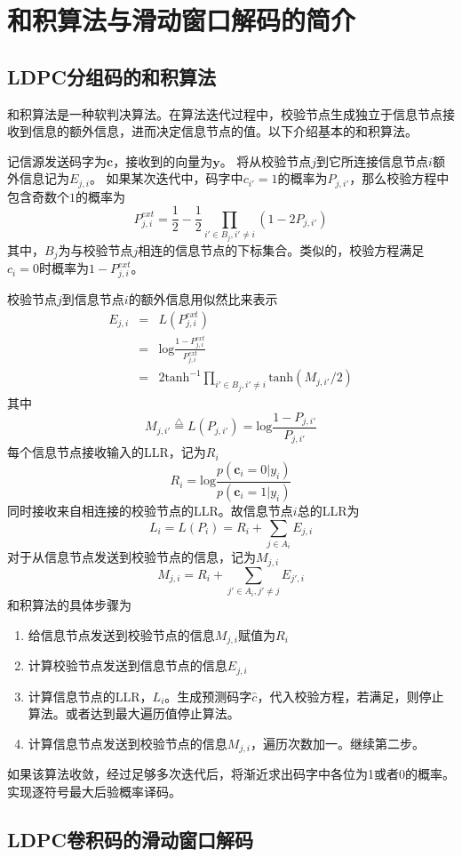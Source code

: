 \chapter{和积算法与滑动窗口解码的简介}
\section{LDPC分组码的和积算法}
和积算法是一种软判决算法。在算法迭代过程中，校验节点生成独立于信息节点接收到信息的额外信息，进而决定信息节点的值。以下介绍基本的和积算法。

记信源发送码字为$\mathbf{c}$，接收到的向量为$\mathbf{y}$。
将从校验节点$j$到它所连接信息节点$i$额外信息记为$E_{j,i}$。
如果某次迭代中，码字中$c_{i'}=1$的概率为$P_{j,i'}$，那么校验方程中包含奇数个$1$的概率为
\[
P_{j,i}^{ext} = \frac{1}{2} - \frac{1}{2} \prod_{i' \in B_j, i' \neq i} (1-2P_{j,i'})
\]
其中，$B_j$为与校验节点$j$相连的信息节点的下标集合。类似的，校验方程满足$c_{i}=0$时概率为$1-P_{j,i}^{ext}$。

校验节点$j$到信息节点$i$的额外信息用似然比来表示
\begin{eqnarray}
E_{j,i} & = & L(P_{j,i}^{ext})\\
& = & \text{log} \frac{1-P_{j,i}^{ext}}{P_{j,i}^{ext}}\\
& = & 2 \text{tanh}^{-1} \prod_{i' \in B_j, i' \neq i} \text{tanh} (M_{j,i'}/2)
\end{eqnarray}
其中
\[
M_{j,i'} \stackrel{\triangle}{=} L(P_{j,i'}) = \text{log} \frac{1-P_{j,i'}}{P_{j,i'}}
\]
每个信息节点接收输入的LLR，记为$R_i$
\[
R_i= \text{log} \frac{p(\mathbf{c}_i=0|y_i)}{p(\mathbf{c}_i=1|y_i)}
\]
同时接收来自相连接的校验节点的LLR。故信息节点$i$总的LLR为
\[
L_i = L(P_i) = R_i + \sum_{j\in A_i}E_{j,i}
\]
对于从信息节点发送到校验节点的信息，记为$M_{j,i}$
\[
M_{j,i}= R_i + \sum_{j' \in A_i,j'\neq j}E_{j',i}
\]
和积算法的具体步骤为
\begin{enumerate}
\item 给信息节点发送到校验节点的信息$M_{j,i}$赋值为$R_i$
\item 计算校验节点发送到信息节点的信息$E_{j,i}$
\item 计算信息节点的LLR，$L_i$。生成预测码字$\hat{c}$，代入校验方程，若满足，则停止算法。或者达到最大遍历值停止算法。
\item 计算信息节点发送到校验节点的信息$M_{j,i}$，遍历次数加一。继续第二步。
\end{enumerate}
如果该算法收敛，经过足够多次迭代后，将渐近求出码字中各位为1或者0的概率。实现逐符号最大后验概率译码。
\section{LDPC卷积码的滑动窗口解码}

